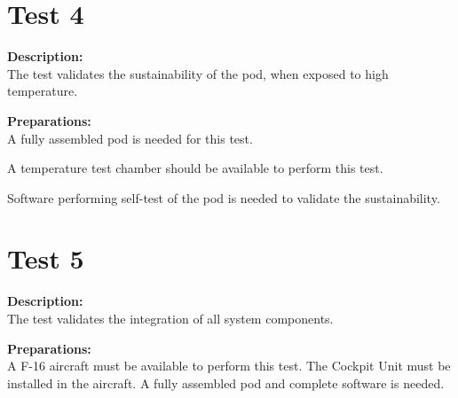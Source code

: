\documentclass[Main]{subfiles}
\begin{document}
\section{Test 4}
\textbf{Description: }\\
The test validates the sustainability of the pod, when exposed to high temperature.

\textbf{Preparations: }\\
A fully assembled pod is needed for this test. 

A temperature test chamber should be available to perform this test.

Software performing self-test of the pod is needed to validate the sustainability.

\section{Test 5}
\textbf{Description: }\\
The test validates the integration of all system components.

\textbf{Preparations: }\\
A F-16 aircraft must be available to perform this test. The Cockpit Unit must be installed in the aircraft.
A fully assembled pod and complete software is needed.
\end{document}

